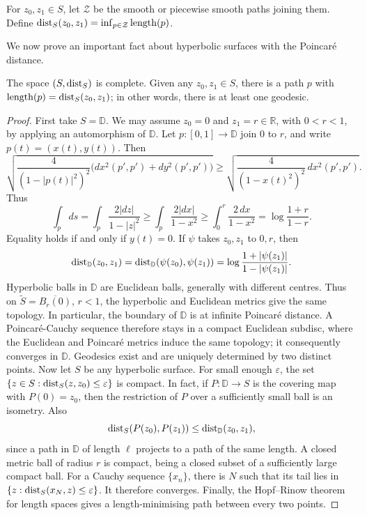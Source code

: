 \documentclass[11pt,a4paper]{article}
\begin{document}
\setcounter{definition}{18}\begin{definition}
For $z_0,z_1\in S$, let $\mathcal Z$ be the smooth or piecewise smooth paths joining them. Define $\operatorname{dist}_S(z_0,z_1)=\inf_{p\in\mathcal Z}\operatorname{length}(p)$.
\end{definition}
We now prove an important fact about hyperbolic surfaces with the Poincar\'e distance.
\setcounter{theorem}{27}\begin{lemma}[Completeness]\label{cd7:complete}
The space $(S,\operatorname{dist}_S)$ is complete. Given any $z_0,z_1\in S$, there is a path $p$ with $\operatorname{length}(p)=\operatorname{dist}_S(z_0,z_1)$; in other words, there is at least one geodesic.
\end{lemma}
\begin{proof}
First take $S=\mathbb D$. We may assume $z_0=0$ and $z_1=r\in\mathbb R$, with $0<r<1$, by applying an automorphism of $\mathbb D$. Let $p\colon[0,1]\to\mathbb D$ join $0$ to $r$, and write $p(t)=(x(t),y(t))$. Then
\[
\sqrt{\frac4{(1-|p(t)|^2)^2}\bigl(dx^2(p',p')+dy^2(p',p')\bigr)}
\ge\sqrt{\frac4{(1-x(t)^2)^2}\,dx^2(p',p')}.
\]
Thus
\[
\int_pds=\int_p\frac{2|dz|}{1-|z|^2}
\ge\int_p\frac{2|dx|}{1-x^2}
\ge\int_0^r\frac{2\,dx}{1-x^2}
=\log\frac{1+r}{1-r}.
\]
Equality holds if and only if $y(t)=0$. If $\psi$ takes $z_0,z_1$ to $0,r$, then
\[
\operatorname{dist}_{\mathbb D}(z_0,z_1)
=\operatorname{dist}_{\mathbb D}(\psi(z_0),\psi(z_1))
=\log\frac{1+|\psi(z_1)|}{1-|\psi(z_1)|}.
\]
Hyperbolic balls in $\mathbb D$ are Euclidean balls, generally with different centres. Thus on $\widetilde S=\overline{B_r(0)}$, $r<1$, the hyperbolic and Euclidean metrics give the same topology. In particular, the boundary of $\mathbb D$ is at infinite Poincar\'e distance. A Poincar\'e-Cauchy sequence therefore stays in a compact Euclidean subdisc, where the Euclidean and Poincar\'e metrics induce the same topology; it consequently converges in $\mathbb D$. Geodesics exist and are uniquely determined by two distinct points.
Now let $S$ be any hyperbolic surface. For small enough $\varepsilon$, the set $\{z\in S:\operatorname{dist}_S(z,z_0)\le\varepsilon\}$ is compact. In fact, if $P\colon\mathbb D\to S$ is the covering map with $P(0)=z_0$, then the restriction of $P$ over a sufficiently small ball is an isometry. Also
\[
\operatorname{dist}_S(P(z_0),P(z_1))\le\operatorname{dist}_{\mathbb D}(z_0,z_1),
\]
since a path in $\mathbb D$ of length $\ell$ projects to a path of the same length. A closed metric ball of radius $r$ is compact, being a closed subset of a sufficiently large compact ball. For a Cauchy sequence $\{x_n\}$, there is $N$ such that its tail lies in $\{z:\operatorname{dist}_S(x_N,z)\le\varepsilon\}$. It therefore converges. Finally, the Hopf--Rinow theorem for length spaces gives a length-minimising path between every two points.
\end{proof}
\end{document}
